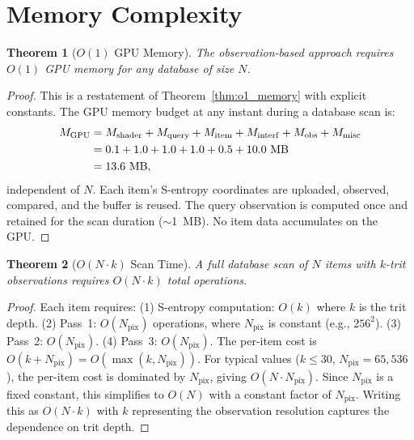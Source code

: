 \documentclass[11pt,twocolumn,a4paper]{article}
\newtheorem{theorem}{Theorem}[section]
\theoremstyle{definition}
\theoremstyle{remark}
\newcommand{\Npix}{N_{\mathrm{pix}}}
\begin{document}
\section{Memory Complexity}
\label{sec:memory_complexity}

\begin{theorem}[$O(1)$ GPU Memory]
\label{thm:memory_complexity}
The observation-based approach requires $O(1)$ GPU memory for any database of size $N$.
\end{theorem}

\begin{proof}
This is a restatement of Theorem~\ref{thm:o1_memory} with explicit constants. The GPU memory budget at any instant during a database scan is:
\begin{align}
M_{\mathrm{GPU}} &= M_{\mathrm{shader}} + M_{\mathrm{query}} + M_{\mathrm{item}} + M_{\mathrm{interf}} + M_{\mathrm{obs}} + M_{\mathrm{misc}} \notag \\
&= 0.1 + 1.0 + 1.0 + 1.0 + 0.5 + 10.0 \text{ MB} \notag \\
&= 13.6 \text{ MB}, \label{eq:memory_budget}
\end{align}
independent of $N$. Each item's S-entropy coordinates are uploaded, observed, compared, and the buffer is reused. The query observation is computed once and retained for the scan duration ($\sim$1~MB). No item data accumulates on the GPU.
\end{proof}

\begin{theorem}[$O(N \cdot k)$ Scan Time]
\label{thm:scan_time}
A full database scan of $N$ items with $k$-trit observations requires $O(N \cdot k)$ total operations.
\end{theorem}

\begin{proof}
Each item requires: (1) S-entropy computation: $O(k)$ where $k$ is the trit depth. (2) Pass~1: $O(\Npix)$ operations, where $\Npix$ is constant (e.g., $256^2$). (3) Pass~2: $O(\Npix)$. (4) Pass~3: $O(\Npix)$. The per-item cost is $O(k + \Npix) = O(\max(k, \Npix))$. For typical values ($k \leq 30$, $\Npix = 65{,}536$), the per-item cost is dominated by $\Npix$, giving $O(N \cdot \Npix)$. Since $\Npix$ is a fixed constant, this simplifies to $O(N)$ with a constant factor of $\Npix$. Writing this as $O(N \cdot k)$ with $k$ representing the observation resolution captures the dependence on trit depth.
\end{proof}
\end{document}
